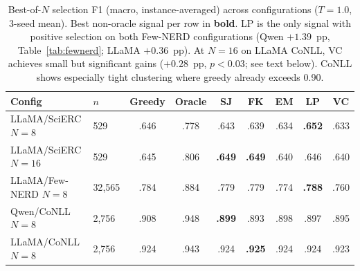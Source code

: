 \begin{table}[t]
\centering
\small
\caption{Best-of-$N$ selection F1 (macro, instance-averaged) across configurations ($T{=}1.0$, 3-seed mean). Best non-oracle signal per row in \textbf{bold}. LP is the only signal with positive selection on both Few-NERD configurations (Qwen $+1.39$~pp, Table~\ref{tab:fewnerd}; LLaMA $+0.36$~pp). At $N{=}16$ on LLaMA CoNLL, VC achieves small but significant gains ($+0.28$~pp, $p{<}0.03$; see text below). CoNLL shows especially tight clustering where greedy already exceeds 0.90.}
\label{tab:cross_selection}
\begin{tabular}{llccccccc}
\toprule
Config & $n$ & Greedy & Oracle & SJ & FK & EM & LP & VC \\
\midrule
LLaMA/SciERC $N{=}8$ & 529 & .646 & .778 & .643 & .639 & .634 & \textbf{.652} & .633 \\
LLaMA/SciERC $N{=}16$ & 529 & .645 & .806 & \textbf{.649} & \textbf{.649} & .640 & .646 & .640 \\
\addlinespace
LLaMA/Few-NERD $N{=}8$ & 32{,}565 & .784 & .884 & .779 & .779 & .774 & \textbf{.788} & .760 \\
\addlinespace
Qwen/CoNLL $N{=}8$ & 2{,}756 & .908 & .948 & \textbf{.899} & .893 & .898 & .897 & .895 \\
LLaMA/CoNLL $N{=}8$ & 2{,}756 & .924 & .943 & .924 & \textbf{.925} & .924 & .924 & .923 \\
\bottomrule
\end{tabular}
\end{table}

